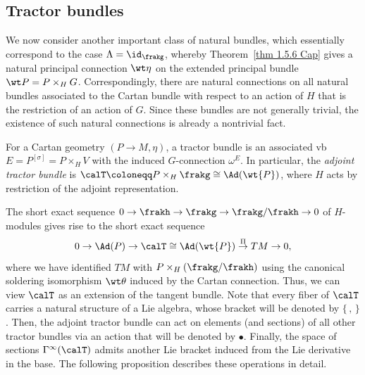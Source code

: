 \subsection{Tractor bundles}

We now consider another important class of natural bundles, which essentially correspond to the case $\Lambda=\id_\frakg$, whereby Theorem~\ref{thm 1.5.6 Cap} gives a natural principal connection $\wt\eta$ on the extended principal bundle $\wt P=P\times_H G$. Correspondingly, there are natural connections on all natural bundles associated to the Cartan bundle with respect to an action of $H$ that is the restriction of an action of $G$. Since these bundles are not generally trivial, the existence of such natural connections is already a nontrivial fact.

\begin{defn}
    For a Cartan geometry $(P\to M,\eta)$, a tractor bundle is an associated \gls{vb} $E=P^{[\sigma]}=P\times_H V$ with the induced $G$-connection $\omega^E$. In particular, the \emph{adjoint tractor bundle} is $\calT\coloneqq P\times_H \frakg\cong \Ad(\wt{P})$, where $H$ acts by restriction of the adjoint representation.
\end{defn}

The short exact sequence $0\to\frakh\to\frakg\to\frakg\slash\frakh\to 0$ of $H$-modules gives rise to the short exact sequence 
\[0\to\Ad(P)\to \calT\cong \Ad(\wt{P})\overset{\Pi}{\to} TM\to 0,\]
where we have identified $TM$ with $P\times_H (\frakg\slash\frakh)$ using the canonical soldering isomorphism $\wt\theta$ induced by the Cartan connection. Thus, we can view $\calT$ as an extension of the tangent bundle. Note that every fiber of $\calT$ carries a natural structure of a Lie algebra, whose bracket will be denoted by $\{\,,\,\}$. Then, the adjoint tractor bundle can act on elements (and sections) of all other tractor bundles via an action that will be denoted by $\bullet$. Finally, the space of sections $\Gamma^\infty(\calT)$ admits another Lie bracket induced from the Lie derivative in the base. The following proposition describes these operations in detail.

